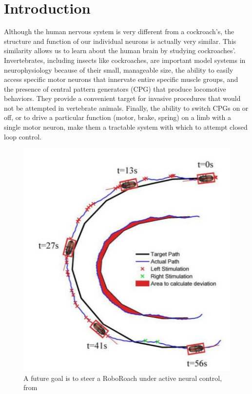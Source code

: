 \section{Introduction}
\label{sec:intro}

Although the human nervous system is very different from a cockroach’s, the structure and function of our individual neurons is actually very similar. This similarity allows us to learn about the human brain by studying cockroaches'. Invertebrates, including insects like cockroaches, are important model systems in neurophysiology because of their small, manageable size, the ability to easily access specific motor neurons that innervate entire specific muscle groups, and the presence of central pattern generators (CPG) that produce locomotive behaviors. They provide a convenient target for invasive procedures that would not be attempted in vertebrate animals. Finally, the ability to switch CPGs on or off, or to drive a particular function (motor, brake, spring) on a limb with a single motor neuron, make them a tractable system with which to attempt closed loop control. 
\begin{figure}[ht!]
\centering
\includegraphics[scale=0.5]{Figures/motivation1.JPG}
\caption{A future goal is to steer a RoboRoach under active neural control, from \citep{whitmire2013kinect}}
\label{fig:motivation1}
\end{figure}

